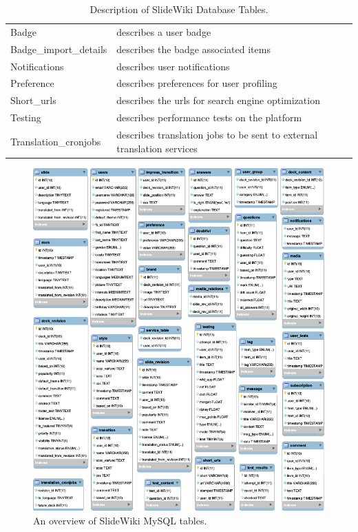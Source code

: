 \documentclass[PhD, Submit, ngerman,UKenglish,table]{scrbook}
\begin{document}
\begin{table}[!ht]
\begin{tabulary}{1\columnwidth}{ll}
Badge & describes a user badge\\
Badge\_import\_details & describes the badge associated items\\
Notifications & describes user notifications\\
Preference & describes preferences for user profiling\\
Short\_urls & describes the \gls{url}s for search engine optimization\\
Testing & describes performance tests on the platform\\
Translation\_cronjobs & describes translation jobs to be sent to external translation services \\

\bottomrule


\end{tabulary}
\caption{Description of SlideWiki Database Tables.}
\label{tab:mysql_tables}
\end{table}





\begin{figure}[!htb]
	\centering
		\includegraphics[width=\columnwidth]{images/erm_OLD2.png}
		\caption{An overview of SlideWiki MySQL tables.}
	\label{fig:mysql_tables}
\end{figure}
\end{document}
